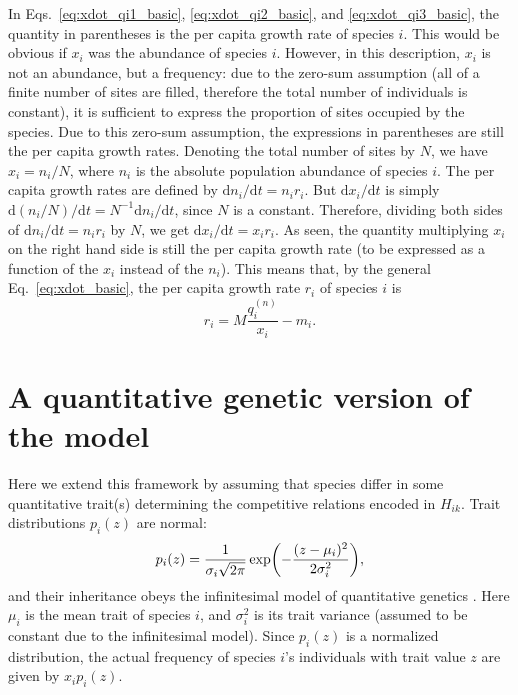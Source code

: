 \documentclass[11pt]{article}
\newcommand{\ud}{\text{d}}
\let\originalleft\left
\let\originalright\right
\renewcommand{\left}{\mathopen{}\mathclose\bgroup\originalleft}
\renewcommand{\right}{\aftergroup\egroup\originalright}
\begin{document}
In Eqs.~\ref{eq:xdot_qi1_basic}, \ref{eq:xdot_qi2_basic}, and \ref{eq:xdot_qi3_basic}, the quantity in parentheses is the per capita growth rate of species $i$. This would be obvious if $x_i$ was the abundance of species $i$. However, in this description, $x_i$ is not an abundance, but a frequency: due to the zero-sum assumption (all of a finite number of sites are filled, therefore the total number of individuals is constant), it is sufficient to express the proportion of sites occupied by the species. Due to this zero-sum assumption, the expressions in parentheses are still the per capita growth rates. Denoting the total number of sites by $N$, we have $x_i = n_i / N$, where $n_i$ is the absolute population abundance of species $i$. The per capita growth rates are defined by $\ud n_i / \ud t = n_i r_i$. But $\ud x_i / \ud t$ is simply $\ud (n_i/N) / \ud t = N^{-1} \ud n_i / \ud t$, since $N$ is a constant. Therefore, dividing both sides of $\ud n_i / \ud t = n_i r_i$ by $N$, we get $\ud x_i / \ud t = x_i r_i$. As seen, the quantity multiplying $x_i$ on the right hand side is still the per capita growth rate (to be expressed as a function of the $x_i$ instead of the $n_i$). This means that, by the general Eq.~\ref{eq:xdot_basic}, the per capita growth rate $r_i$ of species $i$ is
\begin{equation}
  \label{eq:ri_basic}
  r_i = M \frac{q_i^{(n)}}{x_i} - m_i .
\end{equation}


\section{A quantitative genetic version of the model} \label{sec:model_QG}

Here we extend this framework by assuming that species differ in some quantitative trait(s) determining the competitive relations encoded in $H_{ik}$. Trait distributions $p_i(z)$ are normal:
\begin{equation}
  \label{eq:pnorm}
  p_i(z) = \frac{1}{\sigma_i \sqrt{2\pi}}
  \exp \left( - \frac{(z-\mu_i)^2}{2\sigma_i^2} \right) ,
\end{equation}
and their inheritance obeys the infinitesimal model of quantitative genetics \cite{Bulmer1974, BarabasDAndrea2016, Bartonetal2017}. Here $\mu_i$ is the mean trait of species $i$, and $\sigma_i^2$ is its trait variance (assumed to be constant due to the infinitesimal model). Since $p_i(z)$ is a normalized distribution, the actual frequency of species $i$'s individuals with trait value $z$ are given by $x_i p_i(z)$.
\end{document}
